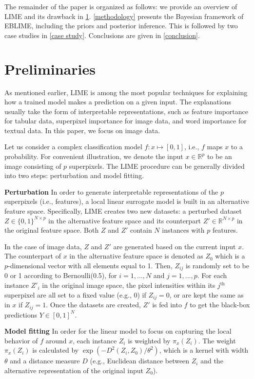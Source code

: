 \documentclass{article}
\theoremstyle{plain}
\theoremstyle{definition}
\theoremstyle{remark}
\begin{document}
The remainder of the paper is organized as follows: we provide an overview of LIME and its drawback in \cref{prelim}. \cref{methodology} presents the Bayesian framework of EBLIME, including the priors and posterior inference. This is followed by two case studies in \cref{case study}. Conclusions are given in \cref{conclusion}.

\section{Preliminaries} \label{prelim}
As mentioned earlier, LIME is among the most popular techniques for explaining how a trained model makes a prediction on a given input. The explanations usually take the form of interpretable representations, such as feature importance for tabular data, superpixel importance for image data, and word importance for textual data. In this paper, we focus on image data. 

Let us consider a complex classification model $f : x \mapsto [0,1]$, i.e., $f$ maps $x$ to a probability. For convenient illustration, we denote the input $x \in \mathbb{R}^p$ to be an image consisting of $p$ superpixels. The LIME procedure can be generally divided into two steps: perturbation and model fitting.

\textbf{Perturbation}\hspace{3pt} In order to generate interpretable representations of the $p$ superpixels (i.e., features), a local linear surrogate model is built in an alternative feature space. Specifically, LIME creates two new datasets: a perturbed dataset $Z\in {\{0,1\}}^{N\times p}$ in the alternative feature space and its counterpart $Z'\in \mathbb{R}^{N\times p}$ in the original feature space. Both $Z$ and $Z'$ contain $N$ instances with $p$ features. 

In the case of image data, $Z$ and $Z'$ are generated based on the current input $x$. The counterpart of $x$ in the alternative feature space is denoted as $Z_0$ which is a $p$-dimensional vector with all elements equal to 1. Then, $Z_{ij}$ is randomly set to be 0 or 1 according to Bernoulli(0.5), for $i=1,...,N$ and $j=1,...,p$. For each instance $Z'_i$ in the original image space, the pixel intensities within its $j^\textrm{th}$ superpixel are all set to a fixed value (e.g., 0) if $Z_{ij}=0$, or are kept the same as in $x$ if $Z_{ij}=1$. Once the datasets are created, $Z'$ is fed into $f$ to get the black-box predictions $Y\in {[0,1]}^{N}$.

\textbf{Model fitting}\hspace{3pt} In order for the linear model to focus on capturing the local behavior of $f$ around $x$, each instance $Z_i$ is weighted by $\pi_x(Z_i)$. The weight $\pi_x(Z_i)$ is calculated by $\exp{(-D^2(Z_i,Z_0)/\theta^2)}$, which is a kernel with width $\theta$ and a distance measure $D$ (e.g., Euclidean distance between $Z_i$ and the alternative representation of the original input $Z_0$).
\end{document}
